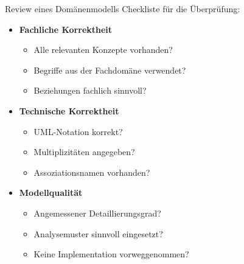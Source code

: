 \begin{KR}{Review eines Domänenmodells}
Checkliste für die Überprüfung:
\begin{itemize}
    \item \textbf{Fachliche Korrektheit}
    \begin{itemize}
        \item Alle relevanten Konzepte vorhanden?
        \item Begriffe aus der Fachdomäne verwendet?
        \item Beziehungen fachlich sinnvoll?
    \end{itemize}
    
    \item \textbf{Technische Korrektheit}
    \begin{itemize}
        \item UML-Notation korrekt?
        \item Multiplizitäten angegeben?
        \item Assoziationsnamen vorhanden?
    \end{itemize}
    
    \item \textbf{Modellqualität}
    \begin{itemize}
        \item Angemessener Detaillierungsgrad?
        \item Analysemuster sinnvoll eingesetzt?
        \item Keine Implementation vorweggenommen?
    \end{itemize}
\end{itemize}
\end{KR}

